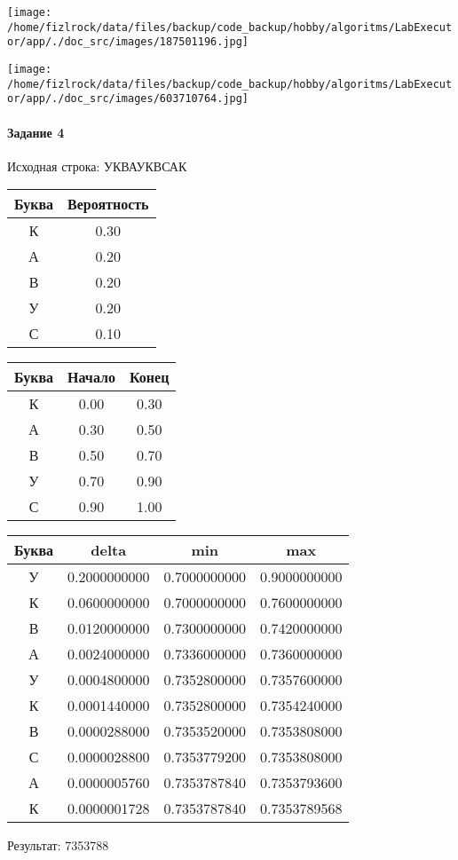 \documentclass[a4paper, 12pt]{article}
\begin{document}
\texttt{[image: /home/fizlrock/data/files/backup/code\_backup/hobby/algoritms/LabExecutor/app/./doc\_src/images/187501196.jpg]}

\texttt{[image: /home/fizlrock/data/files/backup/code\_backup/hobby/algoritms/LabExecutor/app/./doc\_src/images/603710764.jpg]}
\paragraph{Задание 4}


Исходная строка: УКВАУКВСАК

\begin{center}
 \begin{tabular}{ |c|c| } 
  \hline
     Буква & Вероятность \\ \hline
К & 0.30\\\hline
А & 0.20\\\hline
В & 0.20\\\hline
У & 0.20\\\hline
С & 0.10
\\ \hline \end{tabular}
\end{center}
\begin{center}
 \begin{tabular}{ |c|c|c| } 
  \hline
     Буква & Начало & Конец \\ \hline
К & 0.00 & 0.30\\\hline
А & 0.30 & 0.50\\\hline
В & 0.50 & 0.70\\\hline
У & 0.70 & 0.90\\\hline
С & 0.90 & 1.00
\\ \hline \end{tabular}
\end{center}
\begin{center}
 \begin{tabular}{ |c|c|c|c| } 
  \hline
     Буква & delta & min & max \\ \hline
У & 0.2000000000 & 0.7000000000 & 0.9000000000\\\hline
К & 0.0600000000 & 0.7000000000 & 0.7600000000\\\hline
В & 0.0120000000 & 0.7300000000 & 0.7420000000\\\hline
А & 0.0024000000 & 0.7336000000 & 0.7360000000\\\hline
У & 0.0004800000 & 0.7352800000 & 0.7357600000\\\hline
К & 0.0001440000 & 0.7352800000 & 0.7354240000\\\hline
В & 0.0000288000 & 0.7353520000 & 0.7353808000\\\hline
С & 0.0000028800 & 0.7353779200 & 0.7353808000\\\hline
А & 0.0000005760 & 0.7353787840 & 0.7353793600\\\hline
К & 0.0000001728 & 0.7353787840 & 0.7353789568
\\ \hline \end{tabular}
\end{center}
Результат: 7353788
\pagebreak
\end{document}
